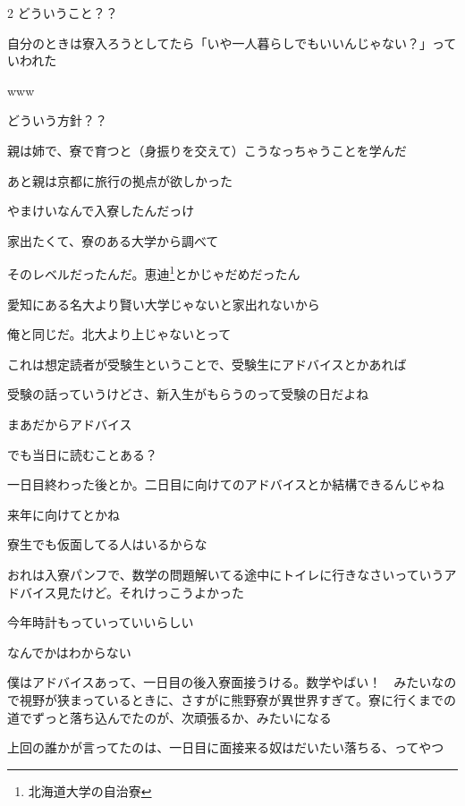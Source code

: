 \begin{multicols}{2}
 どういうこと？？

 自分のときは寮入ろうとしてたら「いや一人暮らしでもいいんじゃない？」っていわれた

 www

 どういう方針？？

 親は姉で、寮で育つと（身振りを交えて）こうなっちゃうことを学んだ

 あと親は京都に旅行の拠点が欲しかった

 やまけいなんで入寮したんだっけ

 家出たくて、寮のある大学から調べて

 そのレベルだったんだ。恵迪\footnote{北海道大学の自治寮}とかじゃだめだったん

 愛知にある名大より賢い大学じゃないと家出れないから

 俺と同じだ。北大より上じゃないとって


 これは想定読者が受験生ということで、受験生にアドバイスとかあれば

 受験の話っていうけどさ、新入生がもらうのって受験の日だよね

 まあだからアドバイス

 でも当日に読むことある？

 一日目終わった後とか。二日目に向けてのアドバイスとか結構できるんじゃね

 来年に向けてとかね

 寮生でも仮面してる人はいるからな

 おれは入寮パンフで、数学の問題解いてる途中にトイレに行きなさいっていうアドバイス見たけど。それけっこうよかった

 今年時計もっていっていいらしい

 なんでかはわからない

 僕はアドバイスあって、一日目の後入寮面接うける。数学やばい！　みたいなので視野が狭まっているときに、さすがに熊野寮が異世界すぎて。寮に行くまでの道でずっと落ち込んでたのが、次頑張るか、みたいになる

 上回の誰かが言ってたのは、一日目に面接来る奴はだいたい落ちる、ってやつ


\end{multicols}
